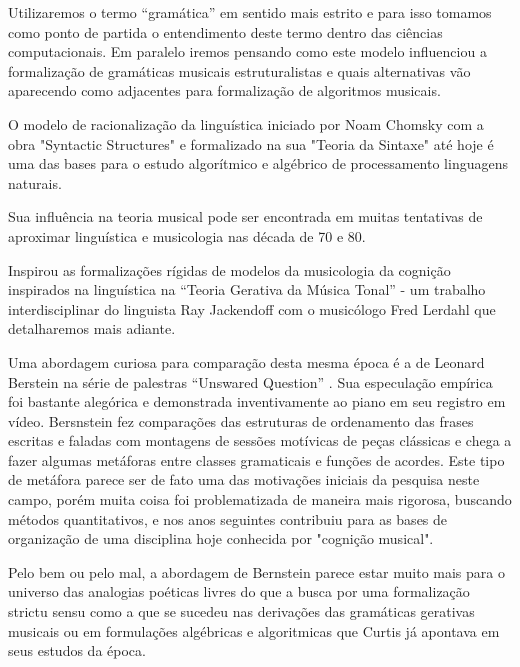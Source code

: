 \documentclass[
	12pt,				%
	openright,			%
	twoside,			%
	a4paper,			%
	english,			%
	french,				%
	spanish,			%
	brazil				%
	]{abntex2}
\begin{document}
Utilizaremos o termo “gramática” em sentido mais estrito e para isso tomamos como ponto de partida o entendimento deste termo dentro das ciências computacionais. Em paralelo iremos pensando como este modelo influenciou a formalização de gramáticas musicais estruturalistas e quais alternativas vão aparecendo como adjacentes para formalização de algoritmos musicais.

O modelo de racionalização da linguística iniciado por Noam Chomsky com a obra "Syntactic Structures" \cite{chomsky1957syntactic} e formalizado na sua "Teoria da Sintaxe"\cite{chomsky1965aspects}  até hoje é uma das bases para o estudo algorítmico e algébrico de processamento linguagens naturais.  

Sua influência na teoria musical pode ser encontrada em muitas tentativas de aproximar linguística e musicologia nas década de 70 e 80.

Inspirou as formalizações rígidas de modelos da musicologia da cognição inspirados na linguística na “Teoria Gerativa da Música Tonal” \cite{lerdahl1983generative} - um trabalho interdisciplinar do linguista Ray Jackendoff com o musicólogo Fred Lerdahl que detalharemos mais adiante.

Uma abordagem curiosa para comparação desta mesma época é a de Leonard Berstein na série de palestras “Unswared Question” \cite{bernstein1976unanswered}. Sua especulação empírica foi bastante alegórica e demonstrada inventivamente ao piano em seu registro em vídeo. Bersnstein fez comparações das estruturas de ordenamento das frases escritas e faladas com montagens de sessões motívicas de peças clássicas e chega a fazer algumas metáforas entre classes gramaticais e funções de acordes. Este tipo de metáfora parece ser de fato uma das motivações iniciais da pesquisa neste campo, porém muita coisa foi problematizada de maneira mais rigorosa, buscando métodos quantitativos, e nos anos seguintes contribuiu para as bases de organização de uma disciplina hoje conhecida por "cognição musical".

Pelo bem ou pelo mal, a abordagem de Bernstein parece estar muito mais para o universo das analogias poéticas livres do que a busca por uma formalização strictu sensu \cite{lerdahl2009genesis} como a que se sucedeu nas derivações das gramáticas gerativas musicais \cite{lerdahl1983generative,temperley2004cognition} ou em formulações algébricas e algoritmicas que Curtis  já apontava em seus estudos da época.

 
\end{document}
